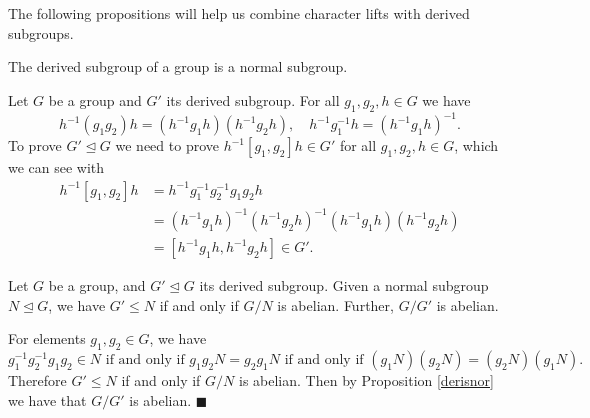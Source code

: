 \documentclass[../Project.tex]{subfiles}
\begin{document}
The following propositions will help us combine character lifts with derived subgroups.
\begin{prop}[{\cite[Proposition 17.10 (1)]{2}}]
	The derived subgroup of a group is a normal subgroup. \label{derisnor}
\end{prop}
\begin{proo*}[{\cite[Proposition 17.10 (1)]{2}}]
	Let $G$ be a group and $G'$ its derived subgroup. For all $g_1,g_2,h \in G$ we have
	$$h^{-1}(g_1g_2)h = (h^{-1}g_1h)(h^{-1}g_2h),\quad h^{-1}g_1^{-1}h = (h^{-1}g_1h)^{-1}.$$
	To prove $G' \trianglelefteq G$ we need to prove $h^{-1}[g_1,g_2]h \in G'$ for all $g_1,g_2,h \in G$, which we can see with
	\begin{align*}
		h^{-1}[g_1,g_2]h &= h^{-1}g_1^{-1}g_2^{-1}g_1g_2h\\
		&= (h^{-1}g_1h)^{-1}(h^{-1}g_2h)^{-1}(h^{-1}g_1h)(h^{-1}g_2h)\\
		&= [h^{-1}g_1h,h^{-1}g_2h] \in G'.
	\end{align*}
\end{proo*}

\begin{prop}[{\cite[Proposition 17.10 (2)]{2}}]
	Let $G$ be a group, and $G' \trianglelefteq G$ its derived subgroup. Given a normal subgroup $N \trianglelefteq G$, we have $G' \leqslant N$ if and only if $G/N$ is abelian. Further, $G/G'$ is abelian.
	\label{quotisabelian}
\end{prop}

\begin{proo*}[{\cite[Proposition 17.10 (2)]{2}}]
	For elements $g_1,g_2 \in G$, we have
	$$g_1^{-1}g_2^{-1}g_1g_2 \in N \text{ if and only if } g_1g_2N = g_2g_1N \text{ if and only if } (g_1N)(g_2N) = (g_2N)(g_1N).$$
Therefore $G' \leqslant N$ if and only if $G/N$ is abelian. Then by Proposition \ref{derisnor} we have that $G/G'$ is abelian. \hfill$\blacksquare$
\end{proo*}
\end{document}
